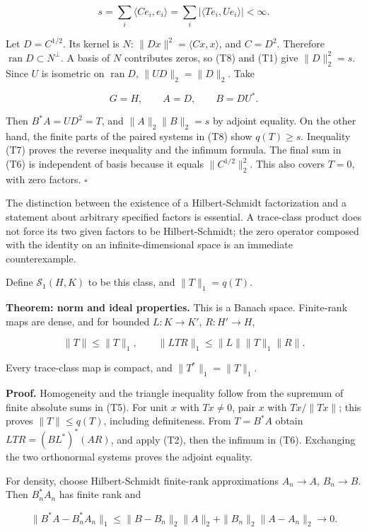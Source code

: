 \documentclass[
  11pt,
]{article}
\begin{document}
\[
s=\sum_i\langle Ce_i,e_i\rangle
=\sum_i|\langle Te_i,Ue_i\rangle|<\infty.                    \tag{T8}
\]

Let \(D=C^{1/2}\). Its kernel is \(N\):
\(\|Dx\|^2=\langle Cx,x\rangle\), and \(C=D^2\). Therefore
\(\operatorname{ran}D\subset N^\perp\). A basis of \(N\) contributes
zeros, so (T8) and (T1) give \(\|D\|_2^2=s\). Since \(U\) is isometric
on \(\operatorname{ran}D\), \(\|UD\|_2=\|D\|_2\). Take

\[
G=H,\qquad A=D,\qquad B=DU^*.
\]

Then \(B^*A=UD^2=T\), and \(\|A\|_2\|B\|_2=s\) by adjoint equality. On
the other hand, the finite parts of the paired systems in (T8) show
\(q(T)\geq s\). Inequality (T7) proves the reverse inequality and the
infimum formula. The final sum in (T6) is independent of basis because
it equals \(\|C^{1/2}\|_2^2\). This also covers \(T=0\), with zero
factors. \(\square\)

The distinction between the existence of a Hilbert-Schmidt factorization
and a statement about arbitrary specified factors is essential. A
trace-class product does not force its two given factors to be
Hilbert-Schmidt; the zero operator composed with the identity on an
infinite-dimensional space is an immediate counterexample.

Define \(\mathcal S_1(H,K)\) to be this class, and \(\|T\|_1=q(T)\).

\textbf{Theorem: norm and ideal properties.} This is a Banach space.
Finite-rank maps are dense, and for bounded \(L:K\to K'\),
\(R:H'\to H\),

\[
\|T\|\leq\|T\|_1,\qquad
\|LTR\|_1\leq\|L\|\|T\|_1\|R\|.                             \tag{T9}
\]

Every trace-class map is compact, and \(\|T^*\|_1=\|T\|_1\).

\textbf{Proof.} Homogeneity and the triangle inequality follow from the
supremum of finite absolute sums in (T5). For unit \(x\) with
\(Tx\ne0\), pair \(x\) with \(Tx/\|Tx\|\); this proves
\(\|T\|\leq q(T)\), including definiteness. From \(T=B^*A\) obtain
\(LTR=(BL^*)^*(AR)\), and apply (T2), then the infimum in (T6).
Exchanging the two orthonormal systems proves the adjoint equality.

For density, choose Hilbert-Schmidt finite-rank approximations
\(A_n\to A\), \(B_n\to B\). Then \(B_n^*A_n\) has finite rank and

\[
\|B^*A-B_n^*A_n\|_1
\leq\|B-B_n\|_2\|A\|_2+\|B_n\|_2\|A-A_n\|_2\longrightarrow0. \tag{T10}
\]
\end{document}
